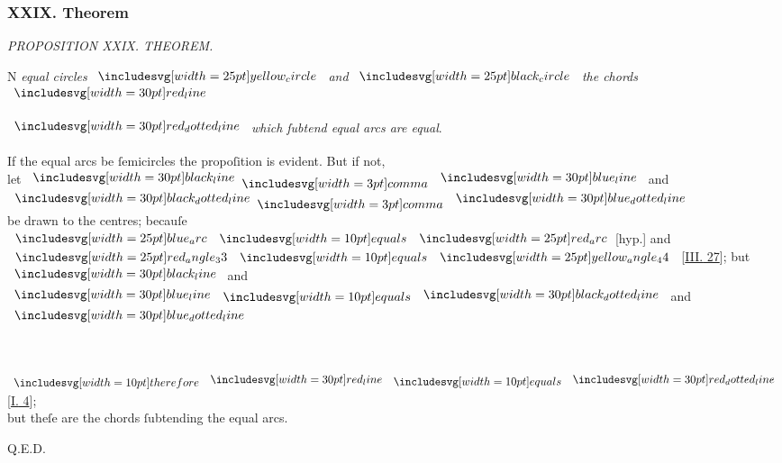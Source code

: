 \documentclass[11pt,preview]{standalone}
\begin{document}
\subsubsection{XXIX. Theorem}

\begin{minipage}[t]{0.54\textwidth}
    \begin{center}
        \textit{PROPOSITION XXIX. THEOREM.}\label{book3pr29} \\
    \end{center}

    \hfill

    \begin{center}
        \raggedright \lettrine[lines=3, loversize=1, nindent=0pt]{}{}N \textit{equal circles} $\img{yellow_circle}$ \textit{and} $\img{black_circle}$ \textit{the chords} $\redline$
    \end{center}
    $\dottedredline$ \textit{which ſubtend equal arcs are equal}.

    \hfill

    \hfill

    \begin{center}
        If the equal arcs be ſemicircles the propoſition is evident. But if not,\\
        let $\blackline \bcomma \blueline$ and $\dottedblackline \bcomma \dottedblueline$\\
        be drawn to the centres; becauſe $\img{blue_arc} \bequals \img{red_arc}$[hyp.] and $\img{red_angle_33} \bequals \img{yellow_angle_44}$ [\hyperref[book3pr27]{\textsc{III.} 27}]; but $\blackline$ and  $\blueline \bequals \dottedblackline$ and $\dottedblueline$
    \end{center}
\end{minipage}%
\hfill
\begin{minipage}[t]{0.43\textwidth}
    \vspace{20pt}
    
    \hfill\\
    
\end{minipage}%

\hfill

\begin{center}
    $\btherefore \redline \bequals \dottedredline$ [\hyperref[book1pr4]{\textsc{I.} 4}];\\
    but theſe are the chords ſubtending the equal arcs.
\end{center}

\hfill

\hfill Q.E.D.
\end{document}
